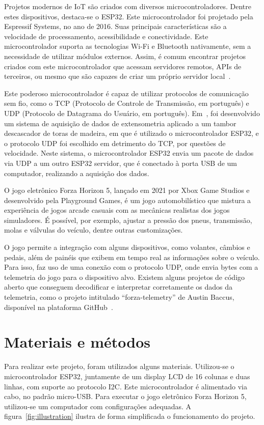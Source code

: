 \documentclass[12pt]{article}
\begin{document}
Projetos modernos de IoT são criados com diversos microcontroladores. Dentre estes dispositivos, destaca-se o ESP32.
Este microcontrolador foi projetado pela Espressif Systems, no ano de 2016.
Suas principais características são a velocidade de processamento, acessibilidade e conectividade.
Este microcontrolador suporta as tecnologias Wi-Fi e Bluetooth nativamente, sem a necessidade de utilizar módulos externos.
Assim, é comum encontrar projetos criados com este microcontrolador que acessam servidores remotos, APIs de terceiros,
ou mesmo que são capazes de criar um próprio servidor local~\cite{kolban}.

Este poderoso microcontrolador é capaz de utilizar protocolos de comunicação sem fio, como o
TCP (Protocolo de Controle de Transmissão, em português) e UDP (Protocolo de Datagrama do Usuário, em português).
Em~\cite{jesus-junior}, foi desenvolvido um sistema de aquisição de dados de extensometria aplicado a um tambor
descascador de toras de madeira, em que é utilizado o microcontrolador ESP32, e o protocolo UDP foi escolhido em
detrimento do TCP, por questões de velocidade. Neste sistema, o microcontrolador ESP32 envia um pacote de dados
via UDP a um outro ESP32 servidor, que é conectado à porta USB de um computador, realizando a aquisição dos dados.

O jogo eletrônico Forza Horizon 5, lançado em 2021 por Xbox Game Studios e desenvolvido pela Playground Games,
é um jogo automobilístico que mistura a experiência de jogos arcade casuais com as mecânicas realistas dos jogos simuladores.
É possível, por exemplo, ajustar a pressão dos pneus, transmissão, molas e válvulas do veículo, dentre outras customizações.

O jogo permite a integração com alguns dispositivos, como volantes, câmbios e pedais, além de painéis que exibem em tempo
real as informações sobre o veículo.
Para isso, faz uso de uma conexão com o protocolo UDP, onde envia bytes com a telemetria do jogo para o dispositivo alvo.
Existem alguns projetos de código aberto que conseguem decodificar e interpretar corretamente os dados da telemetria,
como o projeto intitulado “forza-telemetry” de Austin Baccus, disponível na plataforma GitHub~\cite{baccus}.

\section{Materiais e métodos}

Para realizar este projeto, foram utilizados alguns materiais. Utilizou-se o microcontrolador ESP32,
juntamente de um display LCD de 16 colunas e duas linhas, com suporte ao protocolo I2C.
Este microcontrolador é alimentado via cabo, no padrão micro-USB.
Para executar o jogo eletrônico Forza Horizon 5, utilizou-se um computador com configurações adequadas.
A figura~\ref{fig:illustration} ilustra de forma simplificada o funcionamento do projeto.
\end{document}
